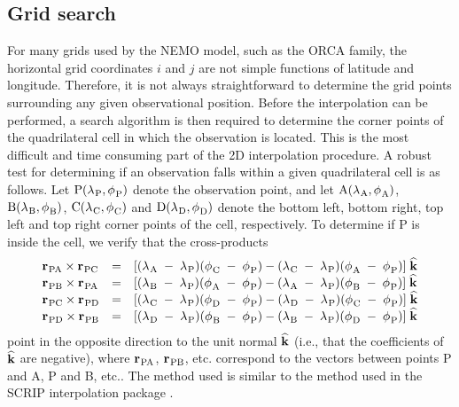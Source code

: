 \documentclass[../tex_main/NEMO_manual]{subfiles}
\begin{document}
\subsection{Grid search}

For many grids used by the NEMO model, such as the ORCA family, the horizontal grid coordinates $i$ and $j$ are not simple functions of latitude and longitude.
Therefore, it is not always straightforward to determine the grid points surrounding any given observational position.
Before the interpolation can be performed, a search algorithm is then required to determine the corner points of 
the quadrilateral cell in which the observation is located.
This is the most difficult and time consuming part of the 2D interpolation procedure. 
A robust test for determining if an observation falls within a given quadrilateral cell is as follows.
Let ${\rm P}({\lambda_{}}_{\rm P} ,{\phi_{}}_{\rm P} )$ denote the observation point,
and let ${\rm A}({\lambda_{}}_{\rm A} ,{\phi_{}}_{\rm A} )$, ${\rm B}({\lambda_{}}_{\rm B} ,{\phi_{}}_{\rm B} )$,
${\rm C}({\lambda_{}}_{\rm C} ,{\phi_{}}_{\rm C} )$ and ${\rm D}({\lambda_{}}_{\rm D} ,{\phi_{}}_{\rm D} )$
denote the bottom left, bottom right, top left and top right corner points of the cell, respectively. 
To determine if P is inside the cell, we verify that the cross-products 
\begin{align}
\begin{array}{lllll}
{{\bf r}_{}}_{\rm PA} \times {{\bf r}_{}}_{\rm PC}
& = & [({\lambda_{}}_{\rm A}\; -\; {\lambda_{}}_{\rm P} )
      ({\phi_{}}_{\rm C}   \; -\; {\phi_{}}_{\rm P} )
    - ({\lambda_{}}_{\rm C}\; -\; {\lambda_{}}_{\rm P} )
      ({\phi_{}}_{\rm A}   \; -\; {\phi_{}}_{\rm P} )] \; \widehat{\bf k} \\
{{\bf r}_{}}_{\rm PB} \times {{\bf r}_{}}_{\rm PA}
& = & [({\lambda_{}}_{\rm B}\; -\; {\lambda_{}}_{\rm P} )
      ({\phi_{}}_{\rm A}   \; -\; {\phi_{}}_{\rm P} )
    - ({\lambda_{}}_{\rm A}\; -\; {\lambda_{}}_{\rm P} )
      ({\phi_{}}_{\rm B}   \; -\; {\phi_{}}_{\rm P} )] \; \widehat{\bf k} \\
{{\bf r}_{}}_{\rm PC} \times {{\bf r}_{}}_{\rm PD}
& = & [({\lambda_{}}_{\rm C}\; -\; {\lambda_{}}_{\rm P} )
      ({\phi_{}}_{\rm D}   \; -\; {\phi_{}}_{\rm P} )
    - ({\lambda_{}}_{\rm D}\; -\; {\lambda_{}}_{\rm P} )
      ({\phi_{}}_{\rm C}   \; -\; {\phi_{}}_{\rm P} )] \; \widehat{\bf k} \\
{{\bf r}_{}}_{\rm PD} \times {{\bf r}_{}}_{\rm PB}
& = & [({\lambda_{}}_{\rm D}\; -\; {\lambda_{}}_{\rm P} )
      ({\phi_{}}_{\rm B}   \; -\; {\phi_{}}_{\rm P} )
    - ({\lambda_{}}_{\rm B}\; -\; {\lambda_{}}_{\rm P} )
      ({\phi_{}}_{\rm D}  \;  - \; {\phi_{}}_{\rm P} )] \; \widehat{\bf k} \\
\end{array}
\label{eq:cross}
\end{align}
point in the opposite direction to the unit normal $\widehat{\bf k}$
(i.e., that the coefficients of $\widehat{\bf k}$ are negative),
where ${{\bf r}_{}}_{\rm PA}$, ${{\bf r}_{}}_{\rm PB}$, etc. correspond to
the vectors between points P and A, P and B, etc..
The method used is similar to the method used in the SCRIP interpolation package \citep{Jones_1998}.
\end{document}
